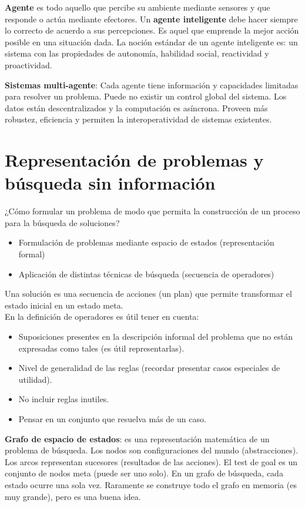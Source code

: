 \documentclass[a4paper,10pt]{paper}
\begin{document}
\textbf{Agente} es todo aquello que percibe su ambiente mediante sensores
y que responde o actúa mediante efectores. Un \textbf{agente inteligente}
debe hacer siempre lo correcto de acuerdo a sus percepciones. Es aquel que
emprende la mejor acción posible en una situación dada. La noción estándar
de un agente inteligente es: un sistema con las propiedades de autonomía,
habilidad social, reactividad y proactividad.

\textbf{Sistemas multi-agente}: Cada agente tiene información y capacidades
limitadas para resolver un problema. Puede no existir un control global del
sistema. Los datos están descentralizados y la computación es asíncrona.
Proveen más robustez, eficiencia y permiten la interoperatividad de sistemas
existentes.

\section{Representación de problemas y búsqueda sin información}
¿Cómo formular un problema de modo que permita la construcción de un proceso
para la búsqueda de soluciones?
\begin{itemize}
    \item Formulación de problemas mediante espacio de estados (representación
        formal)
    \item Aplicación de distintas técnicas de búsqueda (secuencia de operadores)
\end{itemize}
Una solución es una secuencia de acciones (un plan) que permite transformar el
estado inicial en un estado meta.\\
En la definición de operadores es útil tener en cuenta:
\begin{itemize}
    \item Suposiciones presentes en la descripción informal del problema que no
        están expresadas como tales (es útil representarlas).
    \item Nivel de generalidad de las reglas (recordar presentar casos
        especiales de utilidad).
    \item No incluir reglas inutiles.
    \item Pensar en un conjunto que resuelva más de un caso.
\end{itemize}
\textbf{Grafo de espacio de estados}: es una representación matemática de un
problema de búsqueda. Los nodos son configuraciones del mundo (abstracciones).
Los arcos representan sucesores (resultados de las acciones). El test de goal
es un conjunto de nodos meta (puede ser uno solo). En un grafo de búsqueda,
cada estado ocurre una sola vez. Raramente se construye todo el grafo en memoria
(es muy grande), pero es una buena idea.
\end{document}
